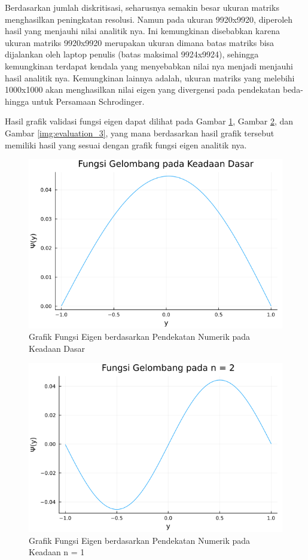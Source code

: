Berdasarkan jumlah diskritisasi, seharusnya semakin besar ukuran matriks menghasilkan peningkatan resolusi. Namun pada ukuran 9920x9920, diperoleh hasil yang menjauhi nilai analitik nya. Ini kemungkinan disebabkan karena ukuran matriks 9920x9920 merupakan ukuran dimana batas matriks bisa dijalankan oleh laptop penulis (batas maksimal 9924x9924), sehingga kemungkinan terdapat kendala yang menyebabkan nilai nya menjadi menjauhi hasil analitik nya. Kemungkinan lainnya adalah, ukuran matriks yang melebihi 1000x1000 akan menghasilkan nilai eigen yang divergensi pada pendekatan beda-hingga untuk Persamaan Schrodinger.

Hasil grafik validasi fungsi eigen dapat dilihat pada Gambar \ref{img:evaluation_1}, Gambar \ref{img:evaluation_2}, dan Gambar \ref{img:evaluation_3}, yang mana berdasarkan \cite{griffithsIntroductionQuantumMechanics2019} hasil grafik tersebut memiliki hasil yang sesuai dengan grafik fungsi eigen analitik nya.

\begin{figure}[H]
	\centering
	\includegraphics[width=12cm, scale=1]{images/penelitian/evaluation_1.png}
	\caption{Grafik Fungsi Eigen berdasarkan Pendekatan Numerik pada Keadaan Dasar}
	\label{img:evaluation_1}
\end{figure}

\begin{figure}[H]
	\centering
	\includegraphics[width=14cm, scale=1]{images/penelitian/evaluation_2.png}
	\caption{Grafik Fungsi Eigen berdasarkan Pendekatan Numerik pada Keadaan n = 1}
	\label{img:evaluation_2}
\end{figure}

